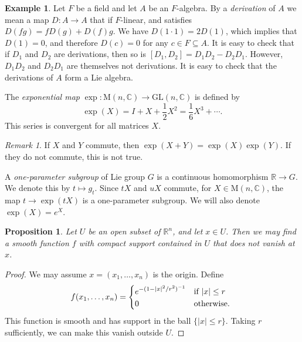 \documentclass[12pt,reqno]{book}%
\newtheorem{proposition}{Proposition}[chapter]
\theoremstyle{definition}
\newtheorem{example}{Example}[chapter]
\theoremstyle{remark}
\newtheorem{remark}[theorem]{Remark}
\theoremstyle{theorem}
\theoremstyle{remark}
\begin{document}
\begin{example}\label{}
    Let $F$ be a field and let $A$ be an $F$-algebra.
    By a \emph{derivation} of $A$ we mean a map $D : A \to A$ that if $F$-linear, and satisfies $D(fg) = fD(g) + D(f)g$.
    We have $D(1 \cdot 1) = 2D(1)$, which implies that $D(1) = 0$, and therefore $D(c) = 0$ for any $c \in F \subseteq A$.
    It is easy to check that if $D_1$ and $D_2$ are derivations, then so is $[D_1, D_2] = D_1D_2 - D_2D_1$.
    However, $D_1D_2$ and $D_2D_1$ are themselves not derivations.
    It is easy to check that the derivations of $A$ form a Lie algebra.
\end{example}

The \emph{exponential map} $\exp : \mathrm{M}(n, \mathbb{C}) \to \mathrm{GL}(n, \mathbb{C})$ is defined by
\begin{equation}\label{}
    \exp(X) = I + X + \frac{1}{2}X^2 = \frac{1}{6}X^3 + \cdots.
\end{equation}
This series is convergent for all matrices $X$.

\begin{remark}\label{}%
    If $X$ and $Y$ commute, then $\exp(X+Y) = \exp(X) \exp(Y)$.
    If they do not commute, this is not true.
\end{remark}%

A \emph{one-parameter subgroup} of Lie group $G$ is a continuous homomorphism $\mathbb{R} \to G$.
We denote this by $t \mapsto g_t$.
Since $tX$ and $uX$ commute, for $X \in \mathrm{M}(n, \mathbb{C})$, the map $t \to \exp(tX)$ is a one-parameter subgroup.
We will also denote $\exp(X) = e^X$.

\begin{proposition}\label{prop5.1}%
    Let $U$ be an open subset of $\mathbb{R}^{n}$, and let $x \in U$.
    Then we may find a smooth function $f$ with compact support contained in $U$ that does not vanish at $x$.
\end{proposition}%
\begin{proof}%
    We may assume $x = (x_1, \ldots, x_n)$ is the origin.
    Define
    \[
        f(x_1, \ldots, x_n) =
        \begin{dcases}
            e^{-(1 - |x|^2/r^2)^{-1}} & \text{if} \ |x| \leq r \\
            0 & \text{otherwise.} \ 
        \end{dcases}
    \]
    This function is smooth and has support in the ball $\{|x| \leq r\}$.
    Taking $r$ sufficiently, we can make this vanish outside $U$.
\end{proof}%
\end{document}

